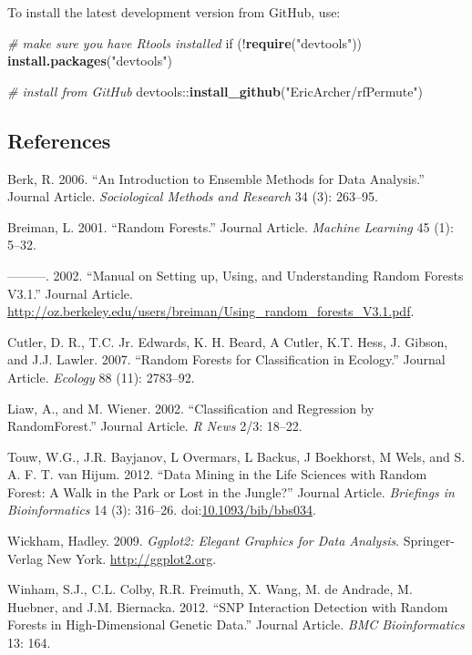 \documentclass[]{article}
\newenvironment{Shaded}{\begin{snugshade}}{\end{snugshade}}
\newcommand{\KeywordTok}[1]{\textcolor[rgb]{0.13,0.29,0.53}{\textbf{{#1}}}}
\newcommand{\StringTok}[1]{\textcolor[rgb]{0.31,0.60,0.02}{{#1}}}
\newcommand{\CommentTok}[1]{\textcolor[rgb]{0.56,0.35,0.01}{\textit{{#1}}}}
\newcommand{\NormalTok}[1]{{#1}}
\begin{document}
To install the latest development version from GitHub, use:

\begin{Shaded}
\begin{Highlighting}[]
\CommentTok{# make sure you have Rtools installed}
\NormalTok{if (!}\KeywordTok{require}\NormalTok{(}\StringTok{"devtools"}\NormalTok{)) }\KeywordTok{install.packages}\NormalTok{(}\StringTok{"devtools"}\NormalTok{)}

\CommentTok{# install from GitHub}
\NormalTok{devtools::}\KeywordTok{install_github}\NormalTok{(}\StringTok{"EricArcher/rfPermute"}\NormalTok{)}
\end{Highlighting}
\end{Shaded}

\subsection*{References}\label{references}

\hypertarget{refs}{}
\hypertarget{ref-RN125}{}
Berk, R. 2006. ``An Introduction to Ensemble Methods for Data
Analysis.'' Journal Article. \emph{Sociological Methods and Research} 34
(3): 263--95.

\hypertarget{ref-RN266}{}
Breiman, L. 2001. ``Random Forests.'' Journal Article. \emph{Machine
Learning} 45 (1): 5--32.

\hypertarget{ref-RN403}{}
---------. 2002. ``Manual on Setting up, Using, and Understanding Random
Forests V3.1.'' Journal Article.
\url{http://oz.berkeley.edu/users/breiman/Using_random_forests_V3.1.pdf}.

\hypertarget{ref-RN126}{}
Cutler, D. R., T.C. Jr. Edwards, K. H. Beard, A Cutler, K.T. Hess, J.
Gibson, and J.J. Lawler. 2007. ``Random Forests for Classification in
Ecology.'' Journal Article. \emph{Ecology} 88 (11): 2783--92.

\hypertarget{ref-RN127}{}
Liaw, A., and M. Wiener. 2002. ``Classification and Regression by
RandomForest.'' Journal Article. \emph{R News} 2/3: 18--22.

\hypertarget{ref-RN128}{}
Touw, W.G., J.R. Bayjanov, L Overmars, L Backus, J Boekhorst, M Wels,
and S. A. F. T. van Hijum. 2012. ``Data Mining in the Life Sciences with
Random Forest: A Walk in the Park or Lost in the Jungle?'' Journal
Article. \emph{Briefings in Bioinformatics} 14 (3): 316--26.
doi:\href{https://doi.org/10.1093/bib/bbs034}{10.1093/bib/bbs034}.

\hypertarget{ref-Wickham2009}{}
Wickham, Hadley. 2009. \emph{Ggplot2: Elegant Graphics for Data
Analysis}. Springer-Verlag New York. \url{http://ggplot2.org}.

\hypertarget{ref-RN268}{}
Winham, S.J., C.L. Colby, R.R. Freimuth, X. Wang, M. de Andrade, M.
Huebner, and J.M. Biernacka. 2012. ``SNP Interaction Detection with
Random Forests in High-Dimensional Genetic Data.'' Journal Article.
\emph{BMC Bioinformatics} 13: 164.
\end{document}
